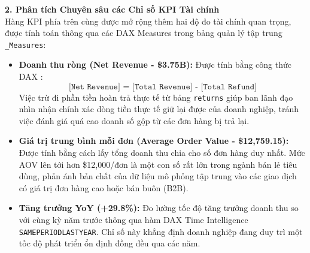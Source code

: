 \textbf{2. Phân tích Chuyên sâu các Chỉ số KPI Tài chính} \\
Hàng KPI phía trên cùng được mở rộng thêm hai độ đo tài chính quan trọng, được tính toán thông qua các DAX Measures \cite{dax_reference} trong bảng quản lý tập trung \texttt{\_Measures}:
\begin{itemize}
    \item \textbf{Doanh thu ròng (Net Revenue - \$3.75B):} 
    Được tính bằng công thức DAX \cite{dax_reference}:
    \begin{equation}
    \texttt{[Net Revenue] = [Total Revenue] - [Total Refund]}
    \label{eq:net_revenue}
    \end{equation}
    Việc trừ đi phần tiền hoàn trả thực tế từ bảng \texttt{returns} giúp ban lãnh đạo nhìn nhận chính xác dòng tiền thực tế giữ lại được của doanh nghiệp, tránh việc đánh giá quá cao doanh số gộp từ các đơn hàng bị trả lại.
    \item \textbf{Giá trị trung bình mỗi đơn (Average Order Value - \$12,759.15):} 
    Được tính bằng cách lấy tổng doanh thu chia cho số đơn hàng duy nhất. Mức AOV lên tới hơn \$12,000/đơn là một con số rất lớn trong ngành bán lẻ tiêu dùng, phản ánh bản chất của dữ liệu mô phỏng tập trung vào các giao dịch có giá trị đơn hàng cao hoặc bán buôn (B2B).
    \item \textbf{Tăng trưởng YoY (+29.8\%):} 
    Đo lường tốc độ tăng trưởng doanh thu so với cùng kỳ năm trước thông qua hàm DAX Time Intelligence \texttt{SAMEPERIODLASTYEAR}. Chỉ số này khẳng định doanh nghiệp đang duy trì một tốc độ phát triển ổn định đồng đều qua các năm.
\end{itemize}

